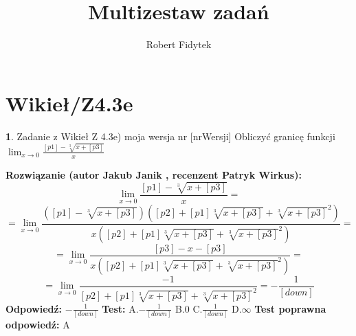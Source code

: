 \documentclass[12pt, a4paper]{article}
\title{Multizestaw zadań}
\author{Robert Fidytek}
\date{}
\theoremstyle{definition} %
\newtheorem{zad}{}
\newcommand{\kategoria}[1]{\section{#1}} %
\newcommand{\zadStart}[1]{\begin{zad}#1\newline} %
\newcommand{\zadStop}{\end{zad}}   %
\newcommand{\rozwStart}[2]{\noindent \textbf{Rozwiązanie (autor #1 , recenzent #2): }\newline} %
\newcommand{\rozwStop}{\newline}                                            %
\newcommand{\odpStart}{\noindent \textbf{Odpowiedź:}\newline}    %
\newcommand{\odpStop}{\newline}                                             %
\newcommand{\testStart}{\noindent \textbf{Test:}\newline} %
\newcommand{\testStop}{\newline} %
\newcommand{\kluczStart}{\noindent \textbf{Test poprawna odpowiedź:}\newline} %
\newcommand{\kluczStop}{\newline} %
\begin{document}
\maketitle


\kategoria{Wikieł/Z4.3e}
\zadStart{Zadanie z Wikieł Z 4.3e) moja wersja nr [nrWersji]}
Obliczyć granicę funkcji $\lim_{x \to 0} \frac{[p1]-\sqrt[3]{x+[p3]}}{x}$
\zadStop
\rozwStart{Jakub Janik}{Patryk Wirkus}
$$\lim_{x \to 0} \frac{[p1]-\sqrt[3]{x+[p3]}}{x}=$$
$$=\lim_{x \to 0} \frac{([p1]-\sqrt[3]{x+[p3]})([p2]+[p1]\sqrt[3]{x+[p3]}+\sqrt[3]{x+[p3]}^2)}{x([p2]+[p1]\sqrt[3]{x+[p3]}+\sqrt[3]{x+[p3]}^2)}=$$
$$=\lim_{x \to 0} \frac{[p3]-x-[p3]}{x([p2]+[p1]\sqrt[3]{x+[p3]}+\sqrt[3]{x+[p3]}^2)}=$$
$$=\lim_{x \to 0} \frac{-1}{[p2]+[p1]\sqrt[3]{x+[p3]}+\sqrt[3]{x+[p3]}^2}=-\frac{1}{[down]}$$
\rozwStop
\odpStart
$-\frac{1}{[down]}$
\odpStop
\testStart
A.$-\frac{1}{[down]}$
B.$0$
C.$\frac{1}{[down]}$
D.$\infty$
\testStop
\kluczStart
A
\kluczStop
\end{document}
